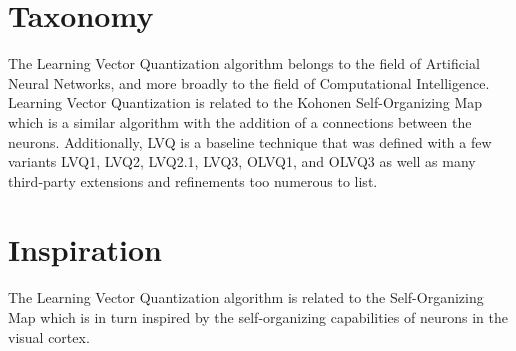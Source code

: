 \documentclass[a4paper, 11pt]{article}
\begin{document}
\section{Taxonomy}
\label{sec:taxonomy}
The Learning Vector Quantization algorithm belongs to the field of Artificial Neural Networks, and more broadly to the field of Computational Intelligence. 
Learning Vector Quantization is related to the Kohonen Self-Organizing Map which is a similar algorithm with the addition of a connections between the neurons. Additionally, LVQ is a baseline technique that was defined with a few variants LVQ1, LVQ2, LVQ2.1, LVQ3, OLVQ1, and OLVQ3 as well as many third-party extensions and refinements too numerous to list.

\section{Inspiration}
\label{sec:inspiration}
The Learning Vector Quantization algorithm is related to the Self-Organizing Map which is in turn inspired by the self-organizing capabilities of neurons in the visual cortex. 
\end{document}
